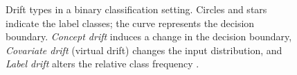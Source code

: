 \begin{figure}[t]
{

    }
    \caption{Drift types in a binary classification setting. Circles and stars indicate the label classes; the curve represents the decision boundary. \textit{Concept drift} induces a change in the decision boundary, \textit{Covariate drift} (virtual drift) changes the input distribution, and \textit{Label drift} alters the relative class frequency \iflncs\cite{gama2014a_survey_on_concept_drift}\else\cite{holzinger2024analysis}\fi.}
    \tightvspace{-5pt}
    \label{fig:distribution_shift}
    \tightvspace{-0.2cm}
\end{figure}
